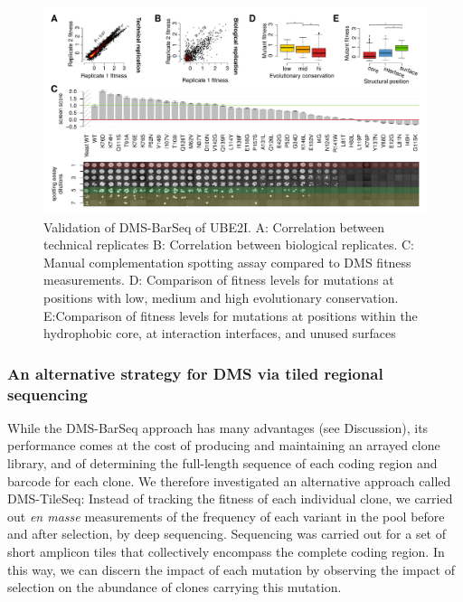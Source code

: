 \begin{landscape}
\begin{figure}
	\centering
	\includegraphics[width=9in]{img/barseq-validation.pdf}
	\caption{Validation of DMS-BarSeq of UBE2I. A: Correlation between technical replicates B: Correlation between biological replicates. C: Manual complementation spotting assay compared to DMS fitness measurements. D: Comparison of fitness levels for mutations at positions with low, medium and high evolutionary conservation. E:Comparison of fitness levels for mutations at positions within the hydrophobic core, at interaction interfaces, and unused surfaces}
	\label{fig:barseqValidation}
\end{figure}
\end{landscape}


\subsubsection{An alternative strategy for DMS via tiled regional sequencing}

While the DMS-BarSeq approach has many advantages (see Discussion), its performance comes at the cost of producing and maintaining an arrayed clone library, and of determining the full-length sequence of each coding region and barcode for each clone. We therefore investigated an alternative approach called DMS-TileSeq: Instead of tracking the fitness of each individual clone, we carried out \textit{en masse} measurements of the frequency of each variant in the pool before and after selection, by deep sequencing.  Sequencing was carried out for a set of short amplicon tiles that collectively encompass the complete coding region.  In this way, we can discern the impact of each mutation by observing the impact of selection on the abundance of clones carrying this mutation.

